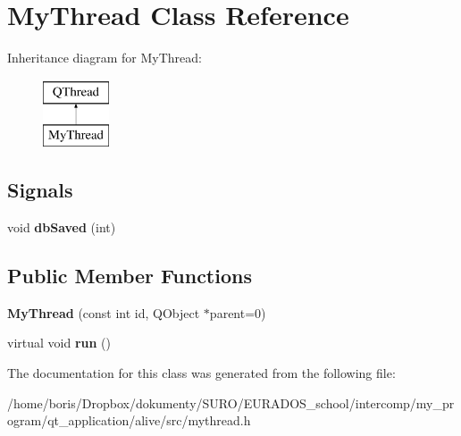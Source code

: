 \hypertarget{classMyThread}{\section{My\-Thread Class Reference}
\label{classMyThread}
}
Inheritance diagram for My\-Thread\-:\begin{figure}[H]
\begin{center}
\leavevmode
\includegraphics[height=2.000000cm]{classMyThread}
\end{center}
\end{figure}
\subsection*{Signals}
\begin{DoxyCompactItemize}
\item 
\hypertarget{classMyThread_ababaa32d071ee6f4c7e48a33ca31b103}{void {\bfseries db\-Saved} (int)}\label{classMyThread_ababaa32d071ee6f4c7e48a33ca31b103}

\end{DoxyCompactItemize}
\subsection*{Public Member Functions}
\begin{DoxyCompactItemize}
\item 
\hypertarget{classMyThread_ae06b3668f170ba0a0d61036d493ada39}{{\bfseries My\-Thread} (const int id, Q\-Object $\ast$parent=0)}\label{classMyThread_ae06b3668f170ba0a0d61036d493ada39}

\item 
\hypertarget{classMyThread_a9489f5226b5eda4dd811b05c0060613a}{virtual void {\bfseries run} ()}\label{classMyThread_a9489f5226b5eda4dd811b05c0060613a}

\end{DoxyCompactItemize}


The documentation for this class was generated from the following file\-:\begin{DoxyCompactItemize}
\item 
/home/boris/\-Dropbox/dokumenty/\-S\-U\-R\-O/\-E\-U\-R\-A\-D\-O\-S\-\_\-school/intercomp/my\-\_\-program/qt\-\_\-application/alive/src/mythread.\-h\end{DoxyCompactItemize}

